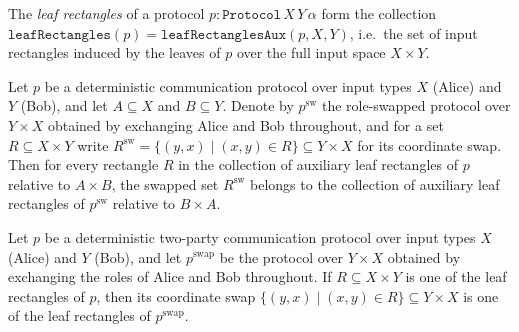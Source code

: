 \begin{definition}
\label{CommunicationComplexity.Deterministic.Protocol.leafRectangles}
\leanok
{}
The \emph{leaf rectangles} of a protocol $p : \texttt{Protocol}\,X\,Y\,\alpha$ form the
collection $\texttt{leafRectangles}(p) = \texttt{leafRectanglesAux}(p, X, Y)$, i.e.\ the set
of input rectangles induced by the leaves of $p$ over the full input space $X \times Y$.
\end{definition}

\begin{theorem}
\label{CommunicationComplexity.Deterministic.Protocol.swapInputSet_mem_leafRectanglesAux_swap}
\leanok
{}
Let $p$ be a deterministic communication protocol over input types $X$ (Alice) and $Y$
(Bob), and let $A \subseteq X$ and $B \subseteq Y$. Denote by $p^{\mathrm{sw}}$ the
role-swapped protocol over $Y \times X$ obtained by exchanging Alice and Bob throughout,
and for a set $R \subseteq X \times Y$ write $R^{\mathrm{sw}} = \{(y,x) \mid (x,y) \in
R\} \subseteq Y \times X$ for its coordinate swap. Then for every rectangle $R$ in the
collection of auxiliary leaf rectangles of $p$ relative to $A \times B$, the swapped set
$R^{\mathrm{sw}}$ belongs to the collection of auxiliary leaf rectangles of
$p^{\mathrm{sw}}$ relative to $B \times A$.
\end{theorem}

\begin{theorem}
\label{CommunicationComplexity.Deterministic.Protocol.swapInputSet_mem_leafRectangles_swap}
\leanok
{}
Let $p$ be a deterministic two-party communication protocol over input types $X$ (Alice)
and $Y$ (Bob), and let $p^{\mathrm{swap}}$ be the protocol over $Y \times X$ obtained by
exchanging the roles of Alice and Bob throughout. If $R \subseteq X \times Y$ is one of
the leaf rectangles of $p$, then its coordinate swap $\{(y,x) \mid (x,y) \in R\}
\subseteq Y \times X$ is one of the leaf rectangles of $p^{\mathrm{swap}}$.
\end{theorem}

